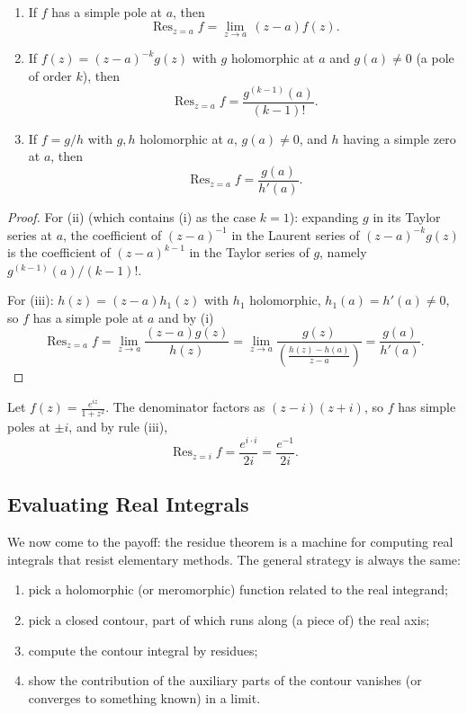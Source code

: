 \begin{proposition}~
    \vspace*{-1.5\baselineskip}
    \begin{enumerate}[label=(\roman*)]
        \item If $f$ has a simple pole at $a$, then
        $$
        \operatorname{Res}_{z = a} f = \lim_{z \to a}\, (z - a) f(z).
        $$
        \item If $f(z) = (z - a)^{-k} g(z)$ with $g$ holomorphic at $a$ and $g(a) \neq 0$ (a pole of order $k$), then
        $$
        \operatorname{Res}_{z = a} f = \frac{g^{(k - 1)}(a)}{(k - 1)!}.
        $$
        \item If $f = g/h$ with $g, h$ holomorphic at $a$, $g(a) \neq 0$, and $h$ having a simple zero at $a$, then
        $$
        \operatorname{Res}_{z = a} f = \frac{g(a)}{h'(a)}.
        $$
    \end{enumerate}
\end{proposition}
\begin{proof}
    For (ii) (which contains (i) as the case $k = 1$): expanding $g$ in its Taylor series at $a$, the coefficient of $(z-a)^{-1}$ in the Laurent series of $(z - a)^{-k}g(z)$ is the coefficient of $(z - a)^{k - 1}$ in the Taylor series of $g$, namely $g^{(k - 1)}(a)/(k - 1)!$.

    For (iii): $h(z) = (z - a)h_1(z)$ with $h_1$ holomorphic, $h_1(a) = h'(a) \neq 0$, so $f$ has a simple pole at $a$ and by (i)
    \[
    \operatorname{Res}_{z = a} f = \lim_{z \to a} \frac{(z - a)g(z)}{h(z)} = \lim_{z \to a} \frac{g(z)}{\left(\frac{h(z) - h(a)}{z - a}\right)} = \frac{g(a)}{h'(a)}.
    \]
\end{proof}

\begin{example}
    Let $f(z) = \frac{e^{iz}}{1 + z^2}$. The denominator factors as $(z - i)(z + i)$, so $f$ has simple poles at $\pm i$, and by rule (iii),
    $$
    \operatorname{Res}_{z = i} f = \frac{e^{i \cdot i}}{2i} = \frac{e^{-1}}{2i}.
    $$
\end{example}

\subsection{Evaluating Real Integrals}

We now come to the payoff: the residue theorem is a machine for computing real integrals that resist elementary methods. The general strategy is always the same:
\begin{enumerate}[label=(\arabic*)]
    \item pick a holomorphic (or meromorphic) function related to the real integrand;
    \item pick a closed contour, part of which runs along (a piece of) the real axis;
    \item compute the contour integral by residues;
    \item show the contribution of the auxiliary parts of the contour vanishes (or converges to something known) in a limit.
\end{enumerate}

